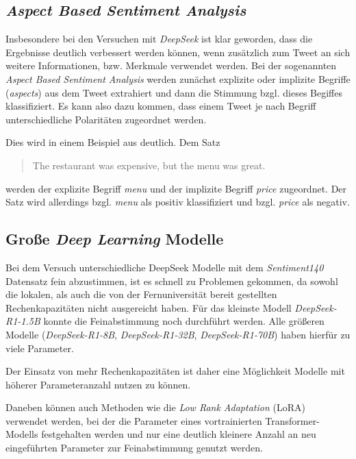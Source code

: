 \subsection{\textit{Aspect Based Sentiment Analysis}}
Insbesondere bei den Versuchen mit \textit{DeepSeek} ist klar geworden, dass die Ergebnisse deutlich verbessert werden können, wenn zusätzlich zum Tweet an sich weitere Informationen, bzw. Merkmale verwendet werden. Bei der sogenannten \textit{Aspect Based Sentiment Analysis} werden zunächst explizite oder implizite Begriffe (\textit{aspects}) aus dem Tweet extrahiert und dann die Stimmung bzgl. dieses Begiffes klassifiziert.
Es kann also dazu kommen, dass einem Tweet je nach Begriff unterschiedliche Polaritäten zugeordnet werden.

Dies wird in einem Beispiel aus \cite{Hua_2024} deutlich. Dem Satz
\begin{quote}
\glqq The restaurant was expensive, but the menu was great.\grqq
\end{quote}
werden der explizite Begriff \textit{menu} und der implizite Begriff \textit{price} zugeordnet.
Der Satz wird allerdings bzgl. \textit{menu} als positiv klassifiziert und bzgl. \textit{price} als negativ.


\subsection{Große \textit{Deep Learning} Modelle}
Bei dem Versuch unterschiedliche DeepSeek Modelle mit dem \textit{Sentiment140} Datensatz fein abzustimmen, ist es schnell zu Problemen gekommen, da sowohl die lokalen, als auch die von der Fernuniversität bereit gestellten Rechenkapazitäten nicht ausgereicht haben.
Für das kleinste Modell \textit{DeepSeek-R1-1.5B} konnte die Feinabstimmung noch durchführt werden. Alle größeren Modelle (\textit{DeepSeek-R1-8B}, \textit{DeepSeek-R1-32B}, \textit{DeepSeek-R1-70B}) haben hierfür zu viele Parameter.

Der Einsatz von mehr Rechenkapazitäten ist daher eine Möglichkeit Modelle mit höherer Parameteranzahl nutzen zu können.

Daneben können auch Methoden wie die \textit{Low Rank Adaptation} (LoRA) \cite{lora2021} verwendet werden, bei der die Parameter eines vortrainierten Transformer-Modells festgehalten werden und nur eine deutlich kleinere Anzahl an neu eingeführten Parameter zur Feinabstimmung genutzt werden.

